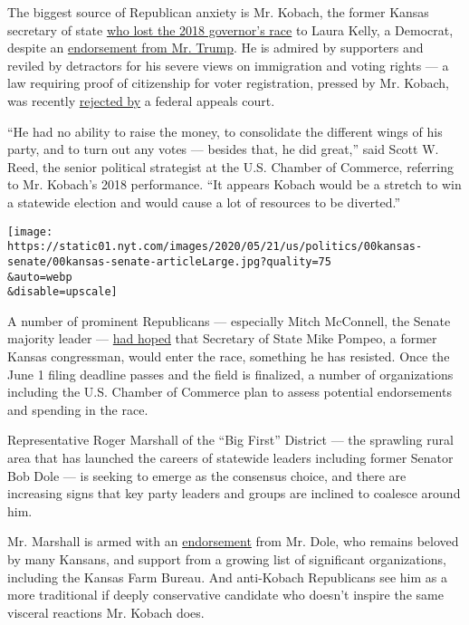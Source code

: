 The biggest source of Republican anxiety is Mr. Kobach, the former
Kansas secretary of state
\href{https://www.nytimes.com/2018/11/06/us/laura-kelly-wins-kansas-governors-race.html}{who
lost the 2018 governor's race} to Laura Kelly, a Democrat, despite an
\href{https://www.nytimes.com/2018/08/06/us/politics/kris-kobach-trump-kansas.html}{endorsement
from Mr. Trump}. He is admired by supporters and reviled by detractors
for his severe views on immigration and voting rights --- a law
requiring proof of citizenship for voter registration, pressed by Mr.
Kobach, was recently
\href{https://www.nbcnews.com/politics/politics-news/appeals-court-blow-kobach-strikes-down-kansas-law-requiring-proof-n1195511}{rejected
by} a federal appeals court.

``He had no ability to raise the money, to consolidate the different
wings of his party, and to turn out any votes --- besides that, he did
great,'' said Scott W. Reed, the senior political strategist at the U.S.
Chamber of Commerce, referring to Mr. Kobach's 2018 performance. ``It
appears Kobach would be a stretch to win a statewide election and would
cause a lot of resources to be diverted.''

\texttt{[image: https://static01.nyt.com/images/2020/05/21/us/politics/00kansas-senate/00kansas-senate-articleLarge.jpg?quality=75\\\&auto=webp\\\&disable=upscale]}

A number of prominent Republicans --- especially Mitch McConnell, the
Senate majority leader ---
\href{https://www.nytimes.com/2020/01/06/us/politics/mike-pompeo-senate-kansas.html}{had
hoped} that Secretary of State Mike Pompeo, a former Kansas congressman,
would enter the race, something he has resisted. Once the June 1 filing
deadline passes and the field is finalized, a number of organizations
including the U.S. Chamber of Commerce plan to assess potential
endorsements and spending in the race.

Representative Roger Marshall of the ``Big First'' District --- the
sprawling rural area that has launched the careers of statewide leaders
including former Senator Bob Dole --- is seeking to emerge as the
consensus choice, and there are increasing signs that key party leaders
and groups are inclined to coalesce around him.

Mr. Marshall is armed with an
\href{https://www.kansascity.com/news/politics-government/article239180118.html}{endorsement}
from Mr. Dole, who remains beloved by many Kansans, and support from a
growing list of significant organizations, including the Kansas Farm
Bureau. And anti-Kobach Republicans see him as a more traditional if
deeply conservative candidate who doesn't inspire the same visceral
reactions Mr. Kobach does.

